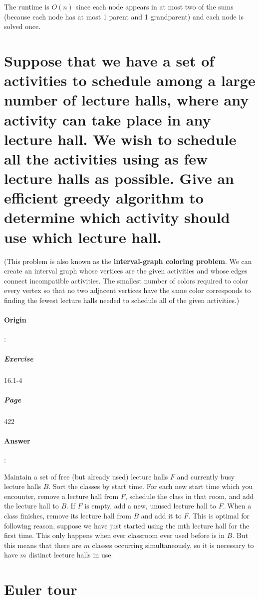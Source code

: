 \documentclass{article}
\begin{document}
The runtime is $O(n)$ since each node appears in at most two of the sums (because each node has at most 1 parent and 1 grandparent) and each node is solved once.



\section{Suppose that we have a set of activities to schedule among a large number of lecture halls, where any activity can take place in any lecture hall. We wish to schedule all the activities using as few lecture halls as possible. Give an efficient greedy algorithm to determine which activity should use which lecture hall.}

(This problem is also known as the \textbf{interval-graph coloring problem}. We can create an interval graph whose vertices are the given activities and whose edges connect incompatible activities. The smallest number of colors required to color every vertex so that no two adjacent vertices have the same color corresponds to finding the fewest lecture halls needed to schedule all of the given activities.)

\paragraph{Origin}:
  \subparagraph{Exercise}16.1-4
  \subparagraph{Page}422
\paragraph{Answer}:

Maintain a set of free (but already used) lecture halls $F$ and currently busy lecture halls $B$. Sort the classes by start time. For each new start time which you encounter, remove a lecture hall from $F$, schedule the class in that room, and add the lecture hall to $B$. If $F$ is empty, add a new, unused lecture hall to $F$. When a class finishes, remove its lecture hall from $B$ and add it to $F$. This is optimal for following reason, suppose we have just started using the mth lecture hall for the first time. This only happens when ever classroom ever used before is in $B$. But this means that there are $m$ classes occurring simultaneously, so it is necessary to have $m$ distinct lecture halls in use.

\section{Euler tour}
\end{document}
